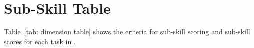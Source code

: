 \section{Sub-Skill Table}


Table~\ref{tab: dimension table} shows the criteria for sub-skill scoring and sub-skill scores for each task in \BenchName{}.